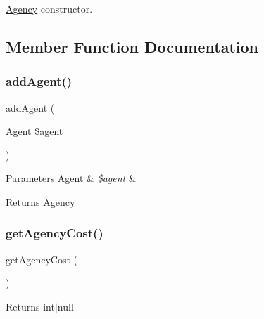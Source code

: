 \mbox{\hyperlink{class_app_1_1_entity_1_1_agency}{Agency}} constructor. 

\subsection{Member Function Documentation}
\mbox{\label{class_app_1_1_entity_1_1_agency_af9b4037bde05427fa94e1f3104de6d97}} 
\subsubsection{\texorpdfstring{addAgent()}{addAgent()}}
{\footnotesize\ttfamily add\+Agent (\begin{DoxyParamCaption}\item[{\mbox{\hyperlink{class_app_1_1_entity_1_1_agent}{Agent}}}]{\$agent }\end{DoxyParamCaption})}


\begin{DoxyParams}[1]{Parameters}
\mbox{\hyperlink{class_app_1_1_entity_1_1_agent}{Agent}} & {\em \$agent} & \\
\hline
\end{DoxyParams}
\begin{DoxyReturn}{Returns}
\mbox{\hyperlink{class_app_1_1_entity_1_1_agency}{Agency}} 
\end{DoxyReturn}
\mbox{\label{class_app_1_1_entity_1_1_agency_a79021d0e11699c138811e3f07ec85cf9}} 
\subsubsection{\texorpdfstring{getAgencyCost()}{getAgencyCost()}}
{\footnotesize\ttfamily get\+Agency\+Cost (\begin{DoxyParamCaption}{ }\end{DoxyParamCaption})}

\begin{DoxyReturn}{Returns}
int$\vert$null 
\end{DoxyReturn}
\mbox{\label{class_app_1_1_entity_1_1_agency_af8ff8a6ad7be0182c2db92302bbde674}} 
